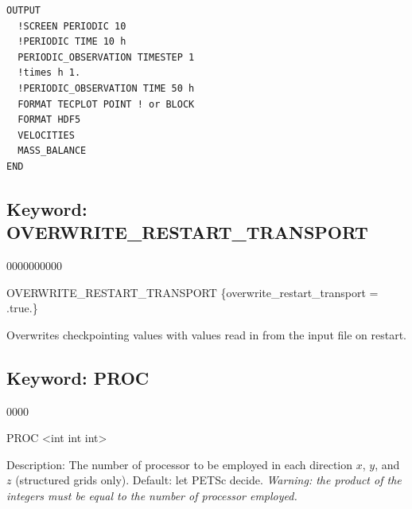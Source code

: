 \begin{mdframed}


\footnotesize
\begin{verbatim}
OUTPUT
  !SCREEN PERIODIC 10
  !PERIODIC TIME 10 h
  PERIODIC_OBSERVATION TIMESTEP 1
  !times h 1.
  !PERIODIC_OBSERVATION TIME 50 h
  FORMAT TECPLOT POINT ! or BLOCK
  FORMAT HDF5
  VELOCITIES
  MASS_BALANCE
END
\end{verbatim}
\normalsize
\end{mdframed}

\hyperlink{target_key}{\return}


\newpage
\protect\hypertarget{target_overwrite}{}

\subsection{Keyword: OVERWRITE\_RESTART\_TRANSPORT}

\hfill\hyperlink{target_key}{\return}

\begin{deflist}{0000000000}
\item[OVERWRITE\_RESTART\_TRANSPORT] \{overwrite\_restart\_transport = .true.\}
\end{deflist}

Overwrites checkpointing values with values read in from the input file on restart.

\hyperlink{target_key}{\return}


\newpage
\protect\hypertarget{target_proc}{}

\subsection{Keyword: PROC}

\hfill\hyperlink{target_key}{\return}

\begin{deflist}{0000}
\item[PROC] <int int int> 
\item[Description:] The number of processor to be employed in each direction $x$, $y$, and $z$ (structured grids only). Default: let PETSc decide. {\em Warning: the product of the integers must be equal to the number of processor employed.}
\end{deflist}

